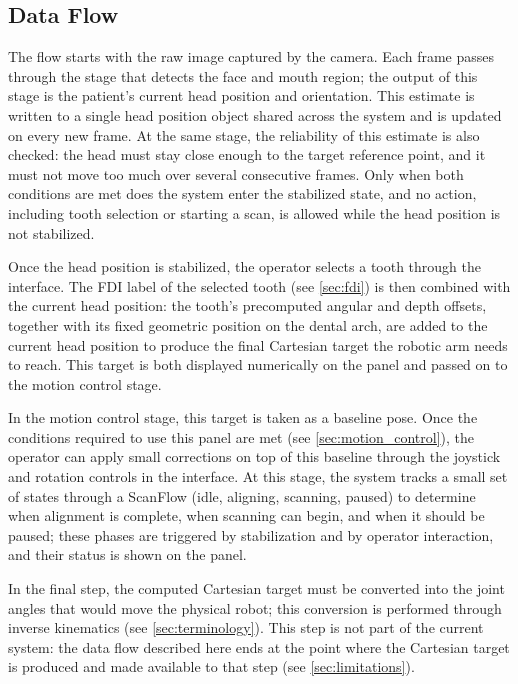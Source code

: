 \subsection{Data Flow}

The flow starts with the raw image captured by the camera. Each frame passes through the stage that detects the face and mouth region; the output of this stage is the patient's current head position and orientation. This estimate is written to a single head position object shared across the system and is updated on every new frame. At the same stage, the reliability of this estimate is also checked: the head must stay close enough to the target reference point, and it must not move too much over several consecutive frames. Only when both conditions are met does the system enter the stabilized state, and no action, including tooth selection or starting a scan, is allowed while the head position is not stabilized.

Once the head position is stabilized, the operator selects a tooth through the interface. The FDI label of the selected tooth (see \autoref{sec:fdi}) is then combined with the current head position: the tooth's precomputed angular and depth offsets, together with its fixed geometric position on the dental arch, are added to the current head position to produce the final Cartesian target the robotic arm needs to reach. This target is both displayed numerically on the panel and passed on to the motion control stage.

In the motion control stage, this target is taken as a baseline pose. Once the conditions required to use this panel are met (see \autoref{sec:motion_control}), the operator can apply small corrections on top of this baseline through the joystick and rotation controls in the interface. At this stage, the system tracks a small set of states through a ScanFlow (idle, aligning, scanning, paused) to determine when alignment is complete, when scanning can begin, and when it should be paused; these phases are triggered by stabilization and by operator interaction, and their status is shown on the panel.

In the final step, the computed Cartesian target must be converted into the joint angles that would move the physical robot; this conversion is performed through inverse kinematics (see \autoref{sec:terminology}). This step is not part of the current system: the data flow described here ends at the point where the Cartesian target is produced and made available to that step (see \autoref{sec:limitations}).

